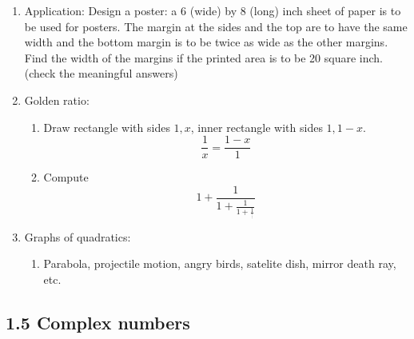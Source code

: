 \documentclass{article}
\begin{document}
\begin{enumerate}
\item Application: Design a poster: a 6 (wide) by 8  (long) inch sheet of paper is to be used for posters. The margin at the sides and the top are to have the same width and the bottom margin is to be twice as wide as the other margins. Find the width of the margins if the printed area is to be 20 square inch. (check the meaningful answers)

\item Golden ratio: 
\begin{enumerate}
\item Draw rectangle with sides $1,x$, inner rectangle with sides $1,1-x$. 
\[
\frac{1}{x}=\frac{1-x}{1}
\]

\item Compute
\[
1 + \frac{1}{1+\frac{1}{1+\frac{1}{\vdots}}}
\]
\end{enumerate}


\item Graphs of quadratics:
\begin{enumerate}
\item Parabola, projectile motion, angry birds, satelite dish, mirror death ray, etc.
\end{enumerate}
\end{enumerate}


\subsection{1.5 Complex numbers}
\end{document}
